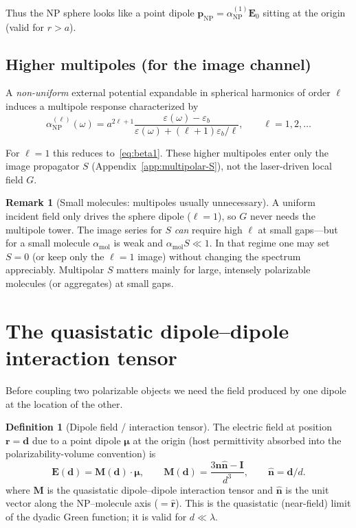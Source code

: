 \documentclass[11pt,a4paper]{article}
\theoremstyle{definition}
\newtheorem{definition}{Definition}[section]
\newtheorem{remark}{Remark}[section]
\newcommand{\epsb}{\varepsilon_b}
\newcommand{\epsm}{\varepsilon}
\newcommand{\alpham}{\alpha_{\text{mol}}}
\newcommand{\alphanp}{\alpha_{\text{NP}}}
\newcommand{\p}{\mathbf{p}}
\newcommand{\rhat}{\hat{\mathbf{r}}}
\newcommand{\nhat}{\hat{\mathbf{n}}}
\newcommand{\I}{\mathbf{I}}
\begin{document}
\noindent
Thus the NP sphere looks like a point dipole $\p_{\mathrm{NP}}=\alphanp^{(1)}\mathbf{E}_0$ sitting at the origin (valid for $r>a$).

\subsection{Higher multipoles (for the image channel)}

\noindent
A \emph{non-uniform} external potential expandable in spherical harmonics of order $\ell$ induces a multipole response characterized by
\begin{equation}
  \alphanp^{(\ell)}(\omega)
  =
  a^{2\ell+1}
  \frac{\epsm(\omega)-\epsb}
       {\epsm(\omega)+(\ell+1)\epsb/\ell},
  \qquad
  \ell=1,2,\ldots
  \label{eq:beta-ell}
\end{equation}

\noindent
For $\ell=1$ this reduces to~\eqref{eq:beta1}. These higher multipoles enter only the image propagator $S$ (Appendix~\ref{app:multipolar-S}), not the laser-driven local field $G$.

\begin{remark}[Small molecules: multipoles usually unnecessary]
\noindent
A uniform incident field only drives the sphere dipole ($\ell=1$), so $G$ never needs the multipole tower. The image series for $S$ \emph{can} require high $\ell$ at small gaps---but for a small molecule $\alpham$ is weak and $\alpham S\ll 1$. In that regime one may set $S=0$ (or keep only the $\ell=1$ image) without changing the spectrum appreciably. Multipolar $S$ matters mainly for large, intensely polarizable molecules (or aggregates) at small gaps.
\end{remark}

\section{The quasistatic dipole--dipole interaction tensor}

\noindent
Before coupling two polarizable objects we need the field produced by one dipole at the location of the other.

\begin{definition}[Dipole field / interaction tensor]
\noindent
The electric field at position $\mathbf{r}=\mathbf{d}$ due to a point dipole $\boldsymbol{\mu}$ at the origin (host permittivity absorbed into the polarizability-volume convention) is
\begin{equation}
  \mathbf{E}(\mathbf{d})
  =
  \mathbf{M}(\mathbf{d})\cdot\boldsymbol{\mu},
  \qquad
  \mathbf{M}(\mathbf{d})
  =
  \frac{3\nhat\nhat - \I}{d^3},
  \qquad
  \nhat=\mathbf{d}/d.
  \label{eq:M-tensor}
\end{equation}
\noindent where \( \mathbf{M} \) is the quasistatic dipole–dipole interaction tensor and \( \nhat \) is the unit vector along the NP--molecule axis (\( = \rhat \)). This is the quasistatic (near-field) limit of the dyadic Green function; it is valid for $d\ll\lambda$.
\end{definition}
\end{document}
